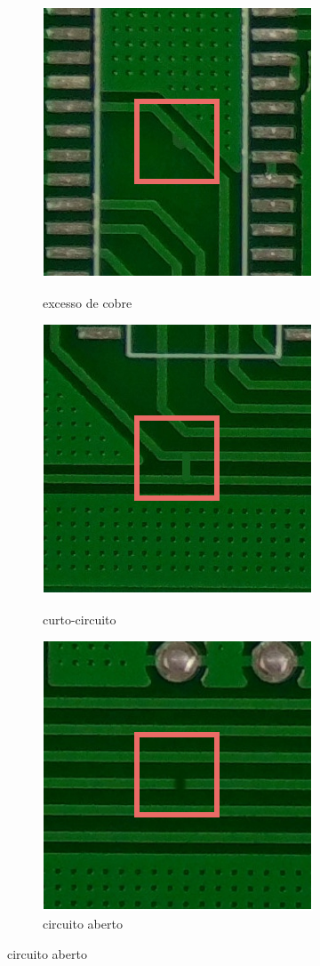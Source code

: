 \begin{figure}[h!]
\begin{subfigure}[H]{0.3\textwidth}
        \label{fig:fund-defeitos3}
    \end{subfigure}
    \begin{subfigure}[H]{0.3\textwidth}
        \centering
        \caption{excesso de cobre}
        \includegraphics[scale=0.6]{img/img-fundamentacao-defeitos5.pdf}
        \label{fig:fund-defeitos5}
    \end{subfigure}
    \begin{subfigure}[H]{0.3\textwidth}
        \centering
        \caption{curto-circuito}
        \includegraphics[scale=0.6]{img/img-fundamentacao-defeitos4.pdf}
        \label{fig:fund-defeitos4}
    \end{subfigure}
    \begin{subfigure}[H]{0.3\textwidth}
        \centering
        \caption{circuito aberto}
        \includegraphics[scale=0.6]{img/img-fundamentacao-defeitos6.pdf}

\end{subfigure}
\end{figure}
